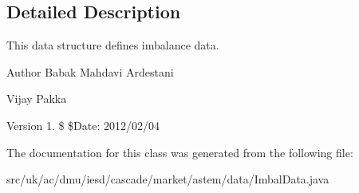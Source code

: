\subsection{Detailed Description}
This data structure defines imbalance data. 

\begin{DoxyAuthor}{Author}
Babak Mahdavi Ardestani 

Vijay Pakka 
\end{DoxyAuthor}
\begin{DoxyVersion}{Version}
1. \$ \$\-Date\-: 2012/02/04 
\end{DoxyVersion}


The documentation for this class was generated from the following file\-:\begin{DoxyCompactItemize}
\item 
src/uk/ac/dmu/iesd/cascade/market/astem/data/Imbal\-Data.\-java\end{DoxyCompactItemize}
